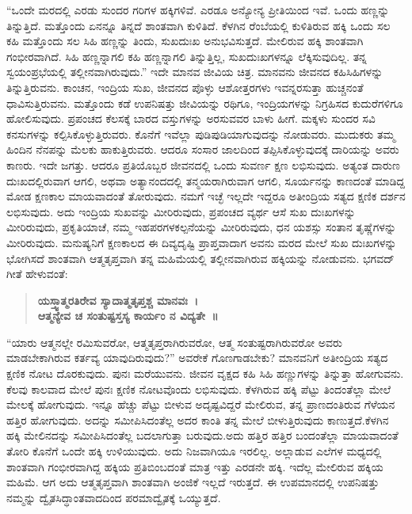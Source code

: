 “ಒಂದೇ ಮರದಲ್ಲಿ ಎರಡು ಸುಂದರ ಗರಿಗಳ ಹಕ್ಕಿಗಳಿವೆ. ಎರಡೂ ಅನ್ಯೋನ್ಯ ಪ್ರೀತಿಯಿಂದ ಇವೆ. ಒಂದು ಹಣ್ಣನ್ನು ತಿನ್ನುತ್ತಿದೆ. ಮತ್ತೊಂದು ಏನನ್ನೂ ತಿನ್ನದೆ ಶಾಂತವಾಗಿ ಕುಳಿತಿದೆ. ಕೆಳಗಿನ ರೆಂಬೆಯಲ್ಲಿ ಕುಳಿತಿರುವ ಹಕ್ಕಿ ಒಂದು ಸಲ ಕಹಿ ಮತ್ತೊಂದು ಸಲ ಸಿಹಿ ಹಣ್ಣನ್ನು ತಿಂದು, ಸುಖದುಃಖ ಅನುಭವಿಸುತ್ತದೆ. ಮೇಲಿರುವ ಹಕ್ಕಿ ಶಾಂತವಾಗಿ ಗಂಭೀರವಾಗಿದೆ. ಸಿಹಿ ಹಣ್ಣನ್ನಾಗಲಿ ಕಹಿ ಹಣ್ಣನ್ನಾಗಲಿ ತಿನ್ನುತ್ತಿಲ್ಲ, ಸುಖದುಃಖಗಳನ್ನೂ ಲೆಕ್ಕಿಸುವುದಿಲ್ಲ. ತನ್ನ ಸ್ವಯಂಪ್ರಭೆಯಲ್ಲಿ ತಲ್ಲೀನವಾಗಿರುವುದು.” ಇದೇ ಮಾನವ ಜೀವಿಯ ಚಿತ್ರ. ಮಾನವನು ಜೀವನದ ಕಹಿಸಿಹಿಗಳನ್ನು ತಿನ್ನುತ್ತಿರುವನು. ಕಾಂಚನ, ಇಂದ್ರಿಯ ಸುಖ, ಜೀವನದ ಪೊಳ್ಳು ಆಶೋತ್ತರಗಳು ಇವನ್ನರಸುತ್ತಾ ಹುಚ್ಚನಂತೆ ಧಾವಿಸುತ್ತಿರುವನು. ಮತ್ತೊಂದು ಕಡೆ ಉಪನಿಷತ್ತು ಜೀವಿಯನ್ನು ರಥಿಗೂ, ಇಂದ್ರಿಯಗಳನ್ನು ನಿಗ್ರಹಿಸದ ಕುದುರೆಗಳಿಗೂ ಹೋಲಿಸುವುದು. ಪ್ರಪಂಚದ ಕೆಲಸಕ್ಕೆ ಬಾರದ ವಸ್ತುಗಳನ್ನು ಅರಸುವವರ ಬಾಳು ಹೀಗೆ. ಮಕ್ಕಳು ಸುಂದರ ಸವಿ ಕನಸುಗಳನ್ನು ಕಲ್ಪಿಸಿಕೊಳ್ಳುತ್ತಿರುವರು. ಕೊನೆಗೆ ಇವೆಲ್ಲಾ ಪುಡಿಪುಡಿಯಾಗುವುದನ್ನು ನೋಡುವರು. ಮುದುಕರು ತಮ್ಮ ಹಿಂದಿನ ನೆನಪನ್ನು ಮೆಲಕು ಹಾಕುತ್ತಿರುವರು. ಆದರೂ ಸಂಸಾರ ಜಾಲದಿಂದ ತಪ್ಪಿಸಿಕೊಳ್ಳುವುದಕ್ಕೆ ದಾರಿಯನ್ನು ಅವರು ಕಾಣರು. ಇದೇ ಜಗತ್ತು. ಆದರೂ ಪ್ರತಿಯೊಬ್ಬರ ಜೀವನದಲ್ಲಿ ಒಂದು ಸುವರ್ಣ ಕ್ಷಣ ಲಭಿಸುವುದು. ಅತ್ಯಂತ ದಾರುಣ ದುಃಖದಲ್ಲಿರುವಾಗ ಆಗಲಿ, ಅಥವಾ ಅತ್ಯಾನಂದದಲ್ಲಿ ತನ್ಮಯರಾಗಿರುವಾಗ ಆಗಲಿ, ಸೂರ್ಯನನ್ನು ಕಾಣದಂತೆ ಮಾಡಿದ್ದ ಮೋಡ ಕ್ಷಣಕಾಲ ಮಾಯವಾದಂತೆ ತೋರುವುದು. ನಮಗೆ ಇಚ್ಛೆ ಇಲ್ಲದೇ ಇದ್ದರೂ ಅತೀಂದ್ರಿಯ ಸತ್ಯದ ಕ್ಷಣಿಕ ದರ್ಶನ ಲಭಿಸುವುದು. ಅದು ಇಂದ್ರಿಯ ಸುಖವನ್ನು ಮೀರಿರುವುದು, ಪ್ರಪಂಚದ ವ್ಯರ್ಥ ಆಸೆ ಸುಖ ದುಃಖಗಳನ್ನು ಮೀರಿರುವುದು, ಪ್ರಕೃತಿಯಾಚೆ, ನಮ್ಮ ಇಹಪರಗಳ\break ಕಲ್ಪನೆಯನ್ನು ಮೀರಿರುವುದು, ಧನ ಯಶಸ್ಸು ಸಂತಾನ ತೃಷ್ಣೆಗಳನ್ನು ಮೀರಿರುವುದು. ಮನುಷ್ಯನಿಗೆ ಕ್ಷಣಕಾಲದ ಈ ದಿವ್ಯದೃಷ್ಟಿ ಪ್ರಾಪ್ತವಾದಾಗ ಅವನು ಮರದ ಮೇಲೆ ಸುಖ ದುಃಖಗಳನ್ನು ಭೋಗಿಸದೆ ಶಾಂತವಾಗಿ ಆತ್ಮತೃಪ್ತವಾಗಿ ತನ್ನ ಮಹಿಮೆಯಲ್ಲಿ ತಲ್ಲೀನವಾಗಿರುವ ಹಕ್ಕಿಯನ್ನು ನೋಡುವನು. ಭಗವದ್​ಗೀತೆ ಹೇಳುವಂತೆ:

\begin{verse}
\textbf{ಯಸ್ತ್ವಾತ್ಮರತಿರೇವ ಸ್ಯಾದಾತ್ಮತೃಪ್ತಶ್ಚ ಮಾನವಃ~।}\\\textbf{ಆತ್ಮನ್ಯೇವ ಚ ಸಂತುಷ್ಟಸ್ತಸ್ಯ ಕಾರ್ಯಂ ನ ವಿದ್ಯತೇ~॥}
\end{verse}

“ಯಾರು ಆತ್ಮನಲ್ಲೇ ರಮಿಸುವರೋ, ಆತ್ಮತೃಪ್ತರಾಗಿರುವರೋ, ಆತ್ಮ ಸಂತುಷ್ಟರಾಗಿರುವರೋ ಅವರು ಮಾಡಬೇಕಾಗಿರುವ ಕರ್ತವ್ಯ ಯಾವುದಿರುವುದು?” ಅವರೇಕೆ ಗೊಣಗಾಡಬೇಕು? ಮಾನವನಿಗೆ ಅತೀಂದ್ರಿಯ ಸತ್ಯದ ಕ್ಷಣಿಕ ನೋಟ ದೊರಕುವುದು. ಪುನಃ ಮರೆಯುವನು. ಜೀವನ ವೃಕ್ಷದ ಕಹಿ ಸಿಹಿ ಹಣ್ಣುಗಳನ್ನು ತಿನ್ನುತ್ತಾ ಹೋಗುವನು. ಕೆಲವು ಕಾಲವಾದ ಮೇಲೆ ಪುನಃ ಕ್ಷಣಿಕ ನೋಟವೊಂದು ಲಭಿಸುವುದು. ಕೆಳಗಿರುವ ಹಕ್ಕಿ ಪೆಟ್ಟು ತಿಂದಂತೆಲ್ಲಾ ಮೇಲೆ ಮೇಲಕ್ಕೆ ಹೋಗುವುದು. ಇನ್ನೂ ಹೆಚ್ಚು ಪೆಟ್ಟು ಬೀಳುವ ಅದೃಷ್ಟವಿದ್ದರೆ ಮೇಲಿರುವ, ತನ್ನ ಪ್ರಾಣದಂತಿರುವ ಗೆಳೆಯನ ಹತ್ತಿರ ಹೋಗುವುದು. ಅದನ್ನು ಸಮೀಪಿಸಿದಂತೆಲ್ಲ ಅದರ ಕಾಂತಿ ತನ್ನ ಮೇಲೆ ಬೀಳುತ್ತಿರುವುದು ಕಾಣುತ್ತದೆ.\break ಕೆಳಗಿನ ಹಕ್ಕಿ ಮೇಲಿನದನ್ನು ಸಮೀಪಿಸಿದಂತೆಲ್ಲ ಬದಲಾಗುತ್ತಾ ಬರುವುದು.\break ಅದು ಹತ್ತಿರ ಹತ್ತಿರ ಬಂದಂತೆಲ್ಲಾ ಮಾಯವಾದಂತೆ ತೋರಿ ಕೊನೆಗೆ ಒಂದೇ ಹಕ್ಕಿ ಉಳಿಯುವುದು. ಅದು ನಿಜವಾಗಿಯೂ ಇರಲಿಲ್ಲ. ಅಲ್ಲಾಡುವ ಎಲೆಗಳ ಮಧ್ಯದಲ್ಲಿ ಶಾಂತವಾಗಿ ಗಂಭೀರವಾಗಿದ್ದ ಹಕ್ಕಿಯ ಪ್ರತಿಬಿಂಬದಂತೆ ಮಾತ್ರ ಇತ್ತು ಎರಡನೇ ಹಕ್ಕಿ. ಇದೆಲ್ಲ ಮೇಲಿರುವ ಹಕ್ಕಿಯ ಮಹಿಮೆ. ಆಗ ಅದು ಆತ್ಮತೃಪ್ತವಾಗಿ ಶಾಂತವಾಗಿ ಅಂಜಿಕೆ ಇಲ್ಲದೆ ಇರುತ್ತದೆ. ಈ ಉಪಮಾನದಲ್ಲಿ ಉಪನಿಷತ್ತು ನಮ್ಮನ್ನು ದ್ವೈತಸಿದ್ಧಾಂತವಾದದಿಂದ ಪರಮಾದ್ವೈತಕ್ಕೆ ಒಯ್ಯುತ್ತದೆ.


